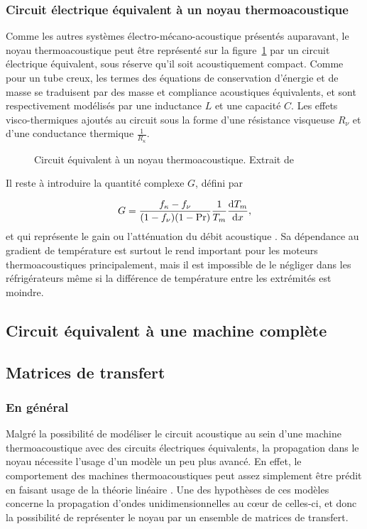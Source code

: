 \subsubsection{Circuit électrique équivalent à un noyau thermoacoustique}

Comme les autres systèmes électro-mécano-acoustique présentés auparavant, le noyau thermoacoustique peut être représenté sur la figure~\ref{fig:CircEquivTAC} par un circuit électrique équivalent, sous réserve qu'il soit acoustiquement compact. Comme pour un tube creux, les termes des équations de conservation d'énergie et de masse se traduisent par des masse et compliance acoustiques équivalents, et sont respectivement modélisés par une inductance $L$ et une capacité $C$. Les effets visco-thermiques ajoutés au circuit sous la forme d'une résistance visqueuse $R_\nu$ et d'une conductance thermique $\frac{1}{R_\kappa}$.

\begin{figure}[!ht]
    \centering
    
    \caption{Circuit équivalent à un noyau thermoacoustique. Extrait de \cite{swift_thermoacoustics_2017}}
    \label{fig:CircEquivTAC}
\end{figure}

Il reste à introduire la quantité complexe $G$, défini par 

\begin{equation}
    G = \frac{f_\kappa - f_\nu}{(1-f_\nu)(1-\mathrm{Pr})}\frac{1}{T_m}\frac{\mathrm{d} T_m}{\mathrm{d} x},
    \label{eq:GainNoyauTA_Swift}
\end{equation}
et qui représente le gain ou l'atténuation du débit acoustique \cite{swift_thermoacoustics_2017}. Sa dépendance au gradient de température est surtout le rend important pour les moteurs thermoacoustiques principalement, mais il est impossible de le négliger dans les réfrigérateurs même si la différence de température entre les extrémités est moindre.

\subsection{Circuit équivalent à une machine complète}

\subsection{Matrices de transfert}
\subsubsection{En général}
Malgré la possibilité de modéliser le circuit acoustique au sein d'une machine thermoacoustique avec des circuits électriques équivalents, la propagation dans le noyau nécessite l'usage d'un modèle un peu plus avancé. En effet, le comportement des machines thermoacoustiques peut assez simplement être prédit en faisant usage de la théorie linéaire \cite{rott_thermoacoustics_1980, swift_thermoacoustics_2017}. Une des  hypothèses de ces modèles concerne la propagation d'ondes unidimensionnelles au c\oe{}ur de celles-ci, et donc la possibilité de représenter le noyau par un ensemble de matrices de transfert.

